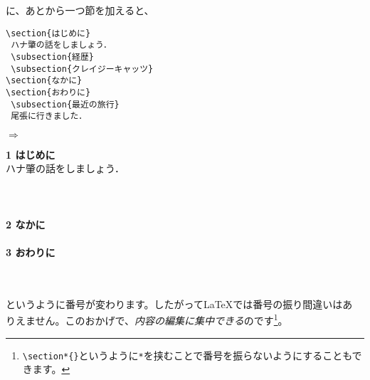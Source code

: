 に、あとから一つ節を加えると、\\
\begin{minipage}[c]{.50\textwidth}
\begin{screen}
\small
\begin{verbatim}
\section{はじめに}
 ハナ肇の話をしましょう．
 \subsection{経歴}
 \subsection{クレイジーキャッツ}
\section{なかに}
\section{おわりに}
 \subsection{最近の旅行}
 尾張に行きました．
\end{verbatim}
\end{screen}
\end{minipage}%
$\Rightarrow$
\begin{minipage}{.45\textwidth}
\begin{shadebox}
{\Large \textbf{1 はじめに}}\\
ハナ肇の話をしましょう．\\
\\
\\
\vspace*{-0.4zw}\\
{\Large \textbf{2 なかに}}\\
\vspace*{-0.4zw}\\
{\Large \textbf{3 おわりに}}\\
\\
\hspace*{1em}{尾張に行きました．}
\end{shadebox}
\end{minipage}
\vspace*{1mm}\\
というように番号が変わります。したがって{\LaTeX}では番号の振り間違いはあ
りえません。このおかげで、\emph{内容の編集に集中できる}のです\footnote{\verb+\section*{}+というように\verb+*+を挟むことで番号を振らないようにすることもできます。}。

